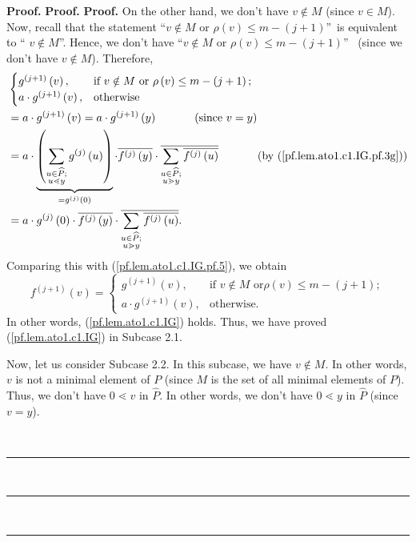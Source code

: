 \documentclass[numbers=enddot,12pt,final,onecolumn,notitlepage]{scrartcl}%
\theoremstyle{definition}
\newenvironment{verlong}{}{}
\newenvironment{proof}[1][Proof]{\noindent\textbf{#1.} }{\ \rule{0.5em}{0.5em}}
\let\sumnonlimits\sum
\renewcommand{\sum}{\sumnonlimits\limits}
\begin{document}
\begin{verlong}
\begin{proof}
\begin{proof}
\begin{proof}
On the other hand, we don't have $v\notin M$ (since $v\in M$). Now, recall
that the statement \textquotedblleft$v\notin M$ or $\rho\left(  v\right)  \leq
m-\left(  j+1\right)  $\textquotedblright\ is equivalent to \textquotedblleft%
$v\notin M$\textquotedblright. Hence, we don't have \textquotedblleft$v\notin
M$ or $\rho\left(  v\right)  \leq m-\left(  j+1\right)  $\textquotedblright%
\ (since we don't have $v\notin M$). Therefore,%
\begin{align*}
&
\begin{cases}
g^{\left(  j+1\right)  }\left(  v\right)  , & \text{if }v\notin M\text{ or
}\rho\left(  v\right)  \leq m-\left(  j+1\right)  ;\\
a\cdot g^{\left(  j+1\right)  }\left(  v\right)  , & \text{otherwise}%
\end{cases}
\\
&  =a\cdot g^{\left(  j+1\right)  }\left(  v\right)  =a\cdot g^{\left(
j+1\right)  }\left(  y\right)  \ \ \ \ \ \ \ \ \ \ \left(  \text{since
}v=y\right) \\
&  =a\cdot\underbrace{\left(  \sum\limits_{\substack{u\in\widehat{P}%
;\\u\lessdot y}}g^{\left(  j\right)  }\left(  u\right)  \right)
}_{=g^{\left(  j\right)  }\left(  0\right)  }\cdot\overline{f^{\left(
j\right)  }\left(  y\right)  }\cdot\overline{\sum\limits_{\substack{u\in
\widehat{P};\\u\gtrdot y}}\overline{f^{\left(  j\right)  }\left(  u\right)  }%
}\ \ \ \ \ \ \ \ \ \ \left(  \text{by (\ref{pf.lem.ato1.c1.IG.pf.3g})}\right)
\\
&  =a\cdot g^{\left(  j\right)  }\left(  0\right)  \cdot\overline{f^{\left(
j\right)  }\left(  y\right)  }\cdot\overline{\sum\limits_{\substack{u\in
\widehat{P};\\u\gtrdot y}}\overline{f^{\left(  j\right)  }\left(  u\right)  }%
}.
\end{align*}
Comparing this with (\ref{pf.lem.ato1.c1.IG.pf.5}), we obtain%
\[
f^{\left(  j+1\right)  }\left(  v\right)  =%
\begin{cases}
g^{\left(  j+1\right)  }\left(  v\right)  , & \text{if }v\notin M\text{ or
}\rho\left(  v\right)  \leq m-\left(  j+1\right)  ;\\
a\cdot g^{\left(  j+1\right)  }\left(  v\right)  , & \text{otherwise.}%
\end{cases}
\]
In other words, (\ref{pf.lem.ato1.c1.IG}) holds. Thus, we have proved
(\ref{pf.lem.ato1.c1.IG}) in Subcase 2.1.

Now, let us consider Subcase 2.2. In this subcase, we have $v\notin M$. In
other words, $v$ is not a minimal element of $P$ (since $M$ is the set of all
minimal elements of $P$). Thus, we don't have $0\lessdot v$ in $\widehat{P}$.
In other words, we don't have $0\lessdot y$ in $\widehat{P}$ (since $v=y$).


\end{proof}
\end{proof}
\end{proof}
\end{verlong}
\end{document}
